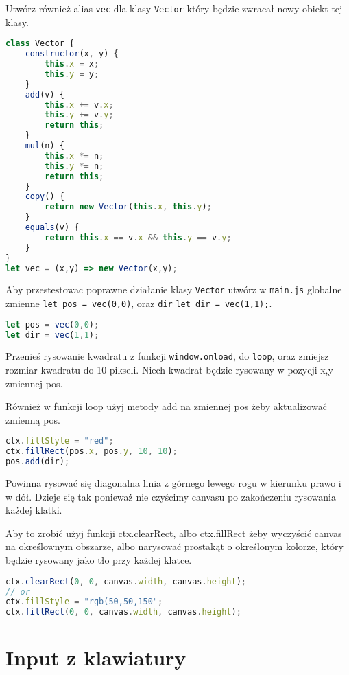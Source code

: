 \documentclass[12pt]{article}
\begin{document}
Utwórz również alias \texttt{vec} dla klasy \texttt{Vector} który będzie zwracał nowy obiekt tej klasy.

\begin{lstlisting}[language=JavaScript]
class Vector {
    constructor(x, y) {
        this.x = x;
        this.y = y;
    }
    add(v) {
        this.x += v.x;
        this.y += v.y;
        return this;
    }
    mul(n) {
        this.x *= n;
        this.y *= n;
        return this;
    }
    copy() {
        return new Vector(this.x, this.y);
    }
    equals(v) {
        return this.x == v.x && this.y == v.y;
    }
}
let vec = (x,y) => new Vector(x,y);
\end{lstlisting}

Aby przestestowac poprawne działanie klasy \texttt{Vector} utwórz w \texttt{main.js} globalne zmienne \texttt{let pos = vec(0,0)}, oraz \texttt{dir} \texttt{let dir = vec(1,1);}.

\begin{lstlisting}[language=JavaScript]
let pos = vec(0,0);
let dir = vec(1,1);
\end{lstlisting}

Przenieś rysowanie kwadratu z funkcji \texttt{window.onload}, do \texttt{loop}, oraz zmiejsz rozmiar kwadratu do 10 pikseli.
Niech kwadrat będzie rysowany w pozycji x,y zmiennej pos.

Również w funkcji loop użyj metody add na zmiennej pos żeby aktualizować zmienną pos.

\begin{lstlisting}[language=JavaScript]
ctx.fillStyle = "red";
ctx.fillRect(pos.x, pos.y, 10, 10);
pos.add(dir);
\end{lstlisting}

Powinna rysować się diagonalna linia z górnego lewego rogu w kierunku prawo i w dół. Dzieje się tak ponieważ nie czyścimy canvasu po zakończeniu rysowania każdej klatki. 

Aby to zrobić użyj funkcji ctx.clearRect, albo ctx.fillRect żeby wyczyścić canvas na określownym obszarze, albo narysować prostakąt o określonym kolorze, który będzie rysowany jako tło przy każdej klatce. 
\begin{lstlisting}[language=JavaScript]
ctx.clearRect(0, 0, canvas.width, canvas.height);
// or
ctx.fillStyle = "rgb(50,50,150";
ctx.fillRect(0, 0, canvas.width, canvas.height);
\end{lstlisting}

\section{Input z klawiatury}
\end{document}
